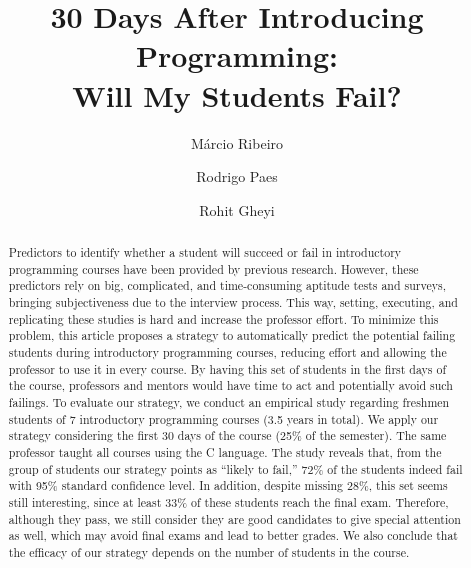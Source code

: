 \documentclass[review]{elsarticle}
\begin{document}
\begin{frontmatter}

\title{30 Days After Introducing Programming:\\Will My Students Fail?}



\author[ufal]{M\'{a}rcio Ribeiro}

\author[ufal]{Rodrigo Paes}

\author[ufcg]{Rohit Gheyi}

\address[ufal]{Federal University of Alagoas, Macei\'{o}, Brazil}
\address[ufcg]{Federal University of Campina Grande, Campina Grande, Brazil}

\begin{abstract}
Predictors to identify whether a student will succeed or fail in introductory programming courses have been provided by previous research. However, these predictors rely on big, complicated, and time-consuming aptitude tests and surveys, bringing subjectiveness due to the interview process. This way, setting, executing, and replicating these studies is hard and increase the professor effort. To minimize this problem, this article proposes a strategy to automatically predict the potential failing students during introductory programming courses, reducing effort and allowing the professor to use it in every course. By having this set of students in the first days of the course, professors and mentors would have time to act and potentially avoid such failings. To evaluate our strategy, we conduct an empirical study regarding freshmen students of 7 introductory programming courses (3.5 years in total). We apply our strategy considering the first 30 days of the course (25\% of the semester). The same professor taught all courses using the C language. The study reveals that, from the group of students our strategy points as ``likely to fail,'' 72\% of the students indeed fail with 95\% standard confidence level. In addition, despite missing 28\%, this set seems still interesting, since at least 33\% of these students reach the final exam. Therefore, although they pass, we still consider they are good candidates to give special attention as well, which may avoid final exams and lead to better grades. We also conclude that the efficacy of our strategy depends on the number of students in the course.



\end{abstract}
\end{frontmatter}
\end{document}
